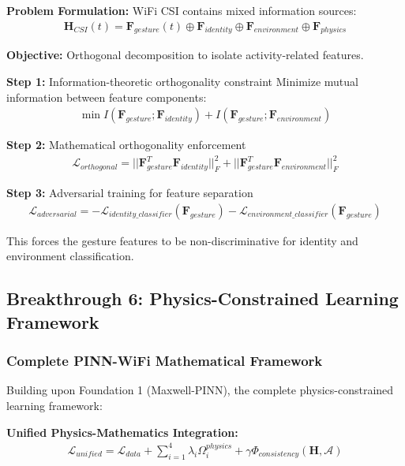 \documentclass[12pt,a4paper]{article}
\begin{document}
\textbf{Problem Formulation:}
WiFi CSI contains mixed information sources:
\begin{align}
\mathbf{H}_{CSI}(t) = \mathbf{F}_{gesture}(t) \oplus \mathbf{F}_{identity} \oplus \mathbf{F}_{environment} \oplus \mathbf{F}_{physics} \label{eq:mixed_features}
\end{align}

\textbf{Objective:} Orthogonal decomposition to isolate activity-related features.

\textbf{Step 1:} Information-theoretic orthogonality constraint
Minimize mutual information between feature components:
\begin{align}
\min I(\mathbf{F}_{gesture}; \mathbf{F}_{identity}) + I(\mathbf{F}_{gesture}; \mathbf{F}_{environment}) \label{eq:mi_minimization}
\end{align}

\textbf{Step 2:} Mathematical orthogonality enforcement
\begin{align}
\mathcal{L}_{orthogonal} = ||\mathbf{F}_{gesture}^T \mathbf{F}_{identity}||_F^2 + ||\mathbf{F}_{gesture}^T \mathbf{F}_{environment}||_F^2 \label{eq:orthogonality_loss}
\end{align}

\textbf{Step 3:} Adversarial training for feature separation
\begin{align}
\mathcal{L}_{adversarial} = -\mathcal{L}_{identity\_classifier}(\mathbf{F}_{gesture}) - \mathcal{L}_{environment\_classifier}(\mathbf{F}_{gesture}) \label{eq:adversarial_decoupling}
\end{align}

This forces the gesture features to be non-discriminative for identity and environment classification.

\subsection{Breakthrough 6: Physics-Constrained Learning Framework}

\subsubsection{Complete PINN-WiFi Mathematical Framework}

Building upon Foundation 1 (Maxwell-PINN), the complete physics-constrained learning framework:

\textbf{Unified Physics-Mathematics Integration:}
\begin{align}
\mathcal{L}_{unified} = \mathcal{L}_{data} + \sum_{i=1}^{4} \lambda_i \Omega_i^{physics} + \gamma \Phi_{consistency}(\mathbf{H}, \mathcal{A}) \label{eq:unified_physics_framework}
\end{align}
\end{document}
